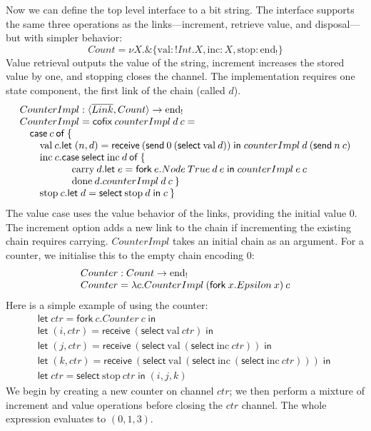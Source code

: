 \documentclass[orivec,envcountsame]{llncs}
\makeatletter
\newcommand{\with}{\mathbin\binampersand}
\newcommand{\gvdual}[1]{\overline{#1}}
\newcommand{\gvout}[2]{{!#1.#2}}
\newcommand{\uto}{\ensuremath{\rightarrow}}
\newcommand{\outterm}{\mathrm{end}_!}
\newcommand{\mkwd}[1]{\mathsf{#1}}
\newcommand{\clabel}[1]{\mathrm{#1}}
\newcommand{\gvsend}[2]{\mkwd{send}\:#1\:#2}
\newcommand{\gvreceive}[1]{\mkwd{receive}\:#1}
\newcommand{\gvlet}[3]{\mkwd{let}\;#1 = #2\;\mkwd{in}\;#3}
\newcommand{\gvselect}[2]{\mkwd{select}\:#1\:#2}
\newcommand{\gvfork}[2]{\mkwd{fork}\:#1.#2}
\newcommand{\lrkwd}{\mkwd{cofix}}
\newcommand{\ba}{\begin{array}}
\newcommand{\ea}{\end{array}}
\newcommand{\bl}{\ba[t]{@{}l@{}}}
\newcommand{\el}{\ea}
\makeatother
\begin{document}
Now we can define the top level interface to a bit string. The interface supports the same three
operations as the links---increment, retrieve value, and disposal---but with simpler behavior:
\[
  Count = \nu X. \with \{ \clabel{val}: \gvout{Int}{X}, \clabel{inc}: X, \clabel{stop}: \outterm \}
\]
Value retrieval outputs the value of the string, increment increases the stored value by one, and
stopping closes the channel. The implementation requires one state component, the first link of the
chain (called $d$).
\[
\bl
CounterImpl : \langle \gvdual{Link}, Count \rangle \uto \outterm \\
CounterImpl = \lrkwd\:counterImpl\:d\:c = \\
\quad \mkwd{case}\:c\:\mkwd{of}\:\{ \\
\quad \quad
  \bl
  \clabel{val}\:c.
     \bl
     \gvlet{(n,d)}{\gvreceive{(\gvsend{0}{(\gvselect{\clabel{val}}{d})})}}
     {counterImpl\:d\:(\gvsend{n}{c})} \\
     \el \\
  \clabel{inc}\:c.
    \bl
    \mkwd{case}\:\gvselect{\clabel{inc}}{d}\:\mkwd{of}\:\{ \\
    \quad
      \bl
      \clabel{carry}\:d.
         \bl
         \gvlet{e}{\gvfork{e}{Node\:True\:d\:e}}{
         counterImpl\:e\:c} \\
         \el \\
      \clabel{done}\:d.counterImpl\:d\:c\:\} \\
      \el \\
    \el \\
  \clabel{stop}\:c.\gvlet{d}{\gvselect{\clabel{stop}}{d}}{c}\:\}
  \el \\
\el
\]
The value case uses the value behavior of the links, providing the initial value 0.  The increment
option adds a new link to the chain if incrementing the existing chain requires
carrying. $CounterImpl$ takes an initial chain as an argument. For a counter, we initialise this to
the empty chain encoding $0$:
\[\bl
  Counter : Count \uto \outterm \\
  Counter = \lambda c.CounterImpl\:(\gvfork{x}{Epsilon\:x})\:c \\
\el\]
Here is a simple example of using the counter:
\[\begin{array}{l}
\gvlet{ctr}{\gvfork{c}{Counter\:c}}{} \\
\gvlet{(i,ctr)}{\gvreceive{(\gvselect{\clabel{val}}{ctr})}}{} \\
\gvlet{(j,ctr)}{\gvreceive{(\gvselect{\clabel{val}}{(\gvselect{\clabel{inc}}{ctr})})}}{} \\
\gvlet{(k,ctr)}{\gvreceive{(\gvselect{\clabel{val}}{(\gvselect{\clabel{inc}}{(\gvselect{\clabel{inc}}{ctr})})})}}{} \\
\gvlet{ctr}{\gvselect{\clabel{stop}}{ctr}}{(i,j,k)}
\end{array}\]
We begin by creating a new counter on channel $ctr$; we then perform a mixture of increment and
value operations before closing the $ctr$ channel.  The whole expression evaluates to $(0,1,3)$.
\end{document}
